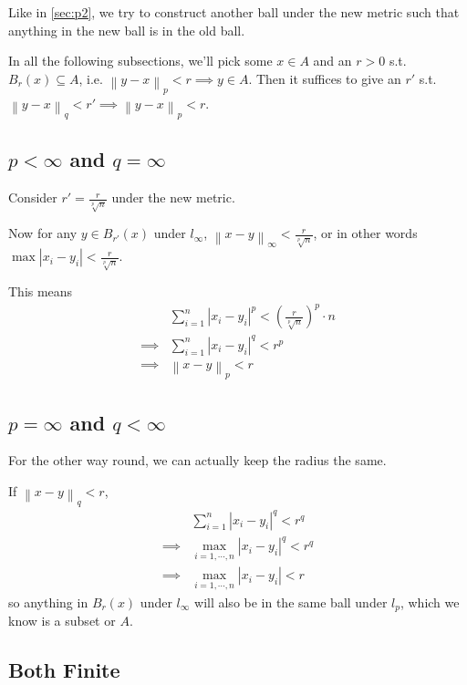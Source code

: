\documentclass[12pt]{article}
\newcommand{\norm}[1]{\left\lVert#1\right\rVert}
\begin{document}
Like in \ref{sec:p2}, we try to construct another ball under the new metric
such that anything in the new ball is in the old ball.

In all the following subsections, we'll pick some $x \in A$ and an $r > 0$
s.t. $B_r(x) \subseteq A$, i.e. $\norm{y-x}_p < r \implies y \in A$.
Then it suffices to give an $r'$ s.t. $\norm{y-x}_q < r' \implies \norm{y-x}_p < r$.

\subsection{\texorpdfstring{$p < \infty$}{p < inf} and \texorpdfstring{$q = \infty$}{q = inf}}

Consider $r'=\frac{r}{\sqrt[p]{n}}$ under the new metric.

Now for any $y \in B_{r'}(x)$ under $l_\infty$, $\norm{x-y}_\infty < \frac{r}{\sqrt[p]{n}}$,
or in other words $\max |x_i-y_i| < \frac{r}{\sqrt[p]{n}}$.

This means
\begin{align*}
  &\sum_{i=1}^{n} |x_i-y_i|^p < \left(\frac{r}{\sqrt[p]{n}}\right)^p \cdot n \\
  \implies{} & \sum_{i=1}^{n} |x_i-y_i|^q < r^p \\
  \implies{} & \norm{x-y}_p < r
\end{align*}

\subsection{\texorpdfstring{$p = \infty$}{p = inf} and \texorpdfstring{$q < \infty$}{q < inf}}

For the other way round, we can actually keep the radius the same.

If $\norm{x-y}_q < r$,
\begin{align*}
  & \sum_{i=1}^{n} |x_i-y_i|^q < r^q \\
  \implies{} & \max_{i=1, \cdots, n} |x_i-y_i|^q < r^q \\
  \implies{} & \max_{i=1, \cdots, n} |x_i-y_i| < r 
\end{align*}
so anything in $B_r(x)$ under $l_\infty$ will also be in the same ball under $l_p$,
which we know is a subset or $A$.

\pagebreak

\subsection{Both Finite}
\end{document}
